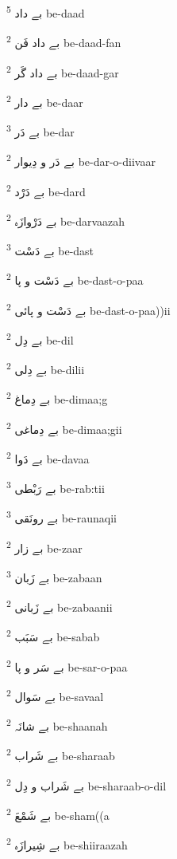 \documentclass[12pt]{article}
\begin{document}
\begin{multicols}{5}
{\ur بے داد}   \textsuperscript{5} be-daad

{\ur بے داد فَن}   \textsuperscript{2} be-daad-fan

{\ur بے داد گَر}   \textsuperscript{2} be-daad-gar

{\ur بے دار}   \textsuperscript{2} be-daar

{\ur بے دَر}   \textsuperscript{3} be-dar

{\ur بے دَر و دِیوار}   \textsuperscript{2} be-dar-o-diivaar

{\ur بے دَرْد}   \textsuperscript{2} be-dard

{\ur بے دَرْوازَہ}   \textsuperscript{2} be-darvaazah

{\ur بے دَسْت}   \textsuperscript{3} be-dast

{\ur بے دَسْت و پا}   \textsuperscript{2} be-dast-o-paa

{\ur بے دَسْت و پائی}   \textsuperscript{2} be-dast-o-paa))ii

{\ur بے دِل}   \textsuperscript{2} be-dil

{\ur بے دِلی}   \textsuperscript{2} be-dilii

{\ur بے دِماغ}   \textsuperscript{2} be-dimaa;g

{\ur بے دِماغی}   \textsuperscript{2} be-dimaa;gii

{\ur بے دَوا}   \textsuperscript{2} be-davaa

{\ur بے رَبْطی}   \textsuperscript{3} be-rab:tii

{\ur بے رونَقی}   \textsuperscript{3} be-raunaqii

{\ur بے زار}   \textsuperscript{2} be-zaar

{\ur بے زَبان}   \textsuperscript{3} be-zabaan

{\ur بے زَبانی}   \textsuperscript{2} be-zabaanii

{\ur بے سَبَب}   \textsuperscript{2} be-sabab

{\ur بے سَر و پا}   \textsuperscript{2} be-sar-o-paa

{\ur بے سَوال}   \textsuperscript{2} be-savaal

{\ur بے شانَہ}   \textsuperscript{2} be-shaanah

{\ur بے شَراب}   \textsuperscript{2} be-sharaab

{\ur بے شَراب و دِل}   \textsuperscript{2} be-sharaab-o-dil

{\ur بے شَمْعَ}   \textsuperscript{2} be-sham((a

{\ur بے شِیرازَہ}   \textsuperscript{2} be-shiiraazah


\end{multicols}
\end{document}
